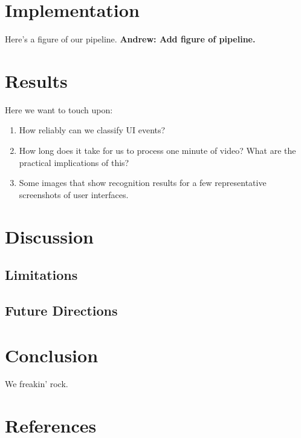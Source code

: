 \documentclass[12pt]{memoir}
\begin{document}
\section{Implementation}
Here's a figure of our pipeline.  \textbf{Andrew: Add figure of pipeline.}


\section{Results}

Here we want to touch upon:
\begin{enumerate}[noitemsep]
\item How reliably can we classify UI events?
\item How long does it take for us to process one minute of video?  What are
the practical implications of this?
\item Some images that show recognition results for a few representative
screenshots of user interfaces.
\end{enumerate}


\section{Discussion}

\subsection{Limitations}

\subsection{Future Directions}


\section{Conclusion}
 
We freakin' rock.


\section{References}
\printbibliography[heading=none]
\end{document}

